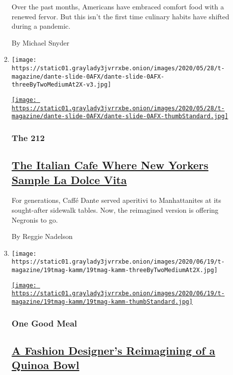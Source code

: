 \begin{enumerate}
\begin{enumerate}
    Over the past months, Americans have embraced comfort food with a
    renewed fervor. But this isn't the first time culinary habits have
    shifted during a pandemic.

    By Michael Snyder
  \item
    \texttt{[image: https://static01.graylady3jvrrxbe.onion/images/2020/05/28/t-magazine/dante-slide-0AFX/dante-slide-0AFX-threeByTwoMediumAt2X-v3.jpg]}

    \href{/2020/06/12/t-magazine/caffe-dante-nyc.html}{\texttt{[image: https://static01.graylady3jvrrxbe.onion/images/2020/05/28/t-magazine/dante-slide-0AFX/dante-slide-0AFX-thumbStandard.jpg]}}

    \hypertarget{the-212}{%
    \subsubsection{The 212}\label{the-212}}

    \hypertarget{the-italian-cafe-where-new-yorkers-sample-la-dolce-vita}{%
    \subsection{\texorpdfstring{\href{/2020/06/12/t-magazine/caffe-dante-nyc.html}{The
    Italian Cafe Where New Yorkers Sample La Dolce
    Vita}}{The Italian Cafe Where New Yorkers Sample La Dolce Vita}}\label{the-italian-cafe-where-new-yorkers-sample-la-dolce-vita}}

    For generations, Caffé Dante served aperitivi to Manhattanites at
    its sought-after sidewalk tables. Now, the reimagined version is
    offering Negronis to go.

    By Reggie Nadelson
  \item
    \texttt{[image: https://static01.graylady3jvrrxbe.onion/images/2020/06/19/t-magazine/19tmag-kamm/19tmag-kamm-threeByTwoMediumAt2X.jpg]}

    \href{/2020/06/26/t-magazine/jesse-kamm-quinoa-bowl-recipe.html}{\texttt{[image: https://static01.graylady3jvrrxbe.onion/images/2020/06/19/t-magazine/19tmag-kamm/19tmag-kamm-thumbStandard.jpg]}}

    \hypertarget{one-good-meal-1}{%
    \subsubsection{One Good Meal}\label{one-good-meal-1}}

    \hypertarget{a-fashion-designers-reimagining-of-a-quinoa-bowl}{%
    \subsection{\texorpdfstring{\href{/2020/06/26/t-magazine/jesse-kamm-quinoa-bowl-recipe.html}{A
    Fashion Designer's Reimagining of a Quinoa
    Bowl}}{A Fashion Designer's Reimagining of a Quinoa Bowl}}\label{a-fashion-designers-reimagining-of-a-quinoa-bowl}}


\end{enumerate}
\end{enumerate}
